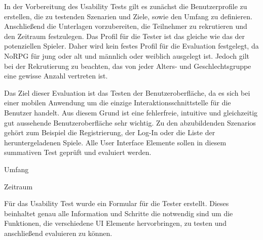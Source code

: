 		In der Vorbereitung des Usability Tests gilt es zunächst die Benutzerprofile zu erstellen, die zu testenden Szenarien und Ziele, sowie den Umfang zu definieren. Anschließend die Unterlagen vorzubereiten, die Teilnehmer zu rekrutieren und den Zeitraum festzulegen. Das Profil für die Tester ist das gleiche wie das der potenziellen Spieler. Daher wird kein festes Profil für die Evaluation festgelegt, da NoRPG für jung oder alt und männlich oder weiblich ausgelegt ist. Jedoch gilt bei der Rekrutierung zu beachten, das von jeder Alters- und Geschlechtsgruppe eine gewisse Anzahl vertreten ist.
		
		Das Ziel dieser Evaluation ist das Testen der Benutzeroberfläche, da es sich bei einer mobilen Anwendung um die einzige Interaktionsschnittstelle für die Benutzer handelt. Aus diesem Grund ist eine fehlerfreie, intuitive und gleichzeitig gut aussehende Benutzeroberfläche sehr wichtig. Zu den abzubildenden Szenarios gehört zum Beispiel die Registrierung, der Log-In oder die Liste der heruntergeladenen Spiele. Alle User Interface Elemente sollen in diesem summativen Test geprüft und evaluiert werden.
		
		Umfang 
		
		Zeitraum 
		
		Für das Usability Test wurde ein Formular für die Tester erstellt. Dieses beinhaltet genau alle Information und Schritte die notwendig sind um die Funktionen, die verschiedene UI Elemente hervorbringen, zu testen und anschließend evaluieren zu können.
